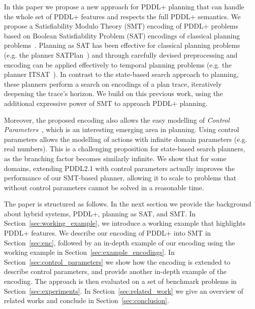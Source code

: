 In this paper we propose a new approach for PDDL+ planning that can handle the whole set of PDDL+ features and respects the full PDDL+ semantics. We propose a Satisfiability Modulo Theory (SMT) encoding of PDDL+ problems based on Boolean Satisfiability Problem (SAT) encodings of classical planning problems~\cite{kau96,rin10}. Planning as SAT has been effective for classical planning problems (e.g. the planner SATPlan~\cite{kau06}) and through carefully devised preprocessing and encoding can be applied effectively to temporal planning problems (e.g. the planner ITSAT~\cite{ran15}). In contrast to the state-based search approach to planning, these planners perform a search on encodings of a plan trace, iteratively deepening the trace's horizon. We build on this previous work, using the additional expressive power of SMT to approach PDDL+ planning.

Moreover, the proposed encoding also allows the easy modelling of \textit{Control Parameters}~\cite{savas2016planning}, which is an interesting emerging area in planning. Using control parameters allows the modelling of actions with infinite domain parameters (e.g. real numbers). This is a challenging proposition for state-based search planners, as the branching factor becomes similarly infinite. We show that for some domains, extending PDDL2.1 with control parameters actually improves the performance of our SMT-based planner, allowing it to scale to problems that without control parameters cannot be solved in a reasonable time.

The paper is structured as follows.
In the next section we provide the background about hybrid systems, PDDL+, planning as SAT, and SMT.
In Section~\ref{sec:working_example}, we introduce a working example that highlights PDDL+ features.
We describe our encoding of PDDL+ into SMT in Section~\ref{sec:enc}, followed by an in-depth example of our encoding using the working example in Section~\ref{sec:example_encodings}.
In Section~\ref{sec:control_parameters} we show how the encoding is extended to describe control parameters, and provide another in-depth example of the encoding.
The approach is then evaluated on a set of benchmark problems in Section~\ref{sec:experiments}.
In Section~\ref{sec:related_work} we give an overview of related works and conclude in Section~\ref{sec:conclusion}.
